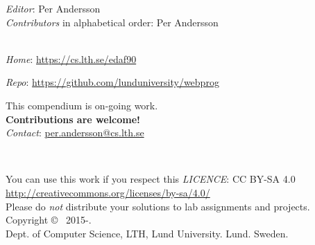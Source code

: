 
\clearpage\null\thispagestyle{empty}
\vfill

{
\setlength{\parindent}{0pt}
\emph{Editor}: Per Andersson \\

%
\emph{Contributors} in alphabetical order: Per Andersson \\
\\ \newline

\emph{Home}: \url{https://cs.lth.se/edaf90} \newline

\emph{Repo}: \url{https://github.com/lunduniversity/webprog} \\ \newline

This compendium is on-going work. \\ \textbf{Contributions are welcome!} \\
\emph{Contact}: \url{per.andersson@cs.lth.se}
\\ \newline

~\\ \newline

You can use this work if you respect this \emph{LICENCE}: CC BY-SA 4.0 \\
\url{http://creativecommons.org/licenses/by-sa/4.0/} \\
Please do \emph{not} distribute your solutions to lab assignments and projects.
\\ \newline
Copyright \copyright~ 2015-\the\year. \\
Dept. of Computer Science, LTH, Lund University. Lund. Sweden.\\
}
